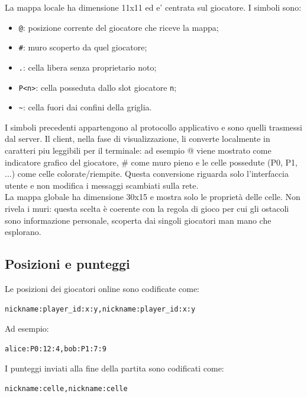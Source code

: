 \documentclass[11pt,a4paper]{article}
\begin{document}
La mappa locale ha dimensione 11x11 ed e' centrata sul giocatore. I simboli sono:

\begin{itemize}
    \item \texttt{@}: posizione corrente del giocatore che riceve la mappa;
    \item \texttt{\#}: muro scoperto da quel giocatore;
    \item \texttt{.}: cella libera senza proprietario noto;
    \item \texttt{P<n>}: cella posseduta dallo slot giocatore \texttt{n};
    \item \texttt{\textasciitilde}: cella fuori dai confini della griglia.
\end{itemize}

I simboli precedenti appartengono al protocollo applicativo e sono quelli trasmessi dal server. Il client, nella fase di visualizzazione, li converte localmente in caratteri piu leggibili per il terminale: ad esempio @ viene mostrato come indicatore grafico del giocatore, \# come muro pieno e le celle possedute (P0, P1, ...) come celle colorate/riempite. Questa conversione riguarda solo l'interfaccia utente e non modifica i messaggi scambiati sulla rete.
\\
La mappa globale ha dimensione 30x15 e mostra solo le proprietà delle celle. Non rivela i muri: questa scelta è coerente con la regola di gioco per cui gli
ostacoli sono informazione personale, scoperta dai singoli giocatori man mano che esplorano.

\subsection{Posizioni e punteggi}

Le posizioni dei giocatori online sono codificate come:

\begin{lstlisting}[style=textstyle]
nickname:player_id:x:y,nickname:player_id:x:y
\end{lstlisting}

Ad esempio:

\begin{lstlisting}[style=textstyle]
alice:P0:12:4,bob:P1:7:9
\end{lstlisting}

I punteggi inviati alla fine della partita sono codificati come:

\begin{lstlisting}[style=textstyle]
nickname:celle,nickname:celle
\end{lstlisting}
\end{document}
